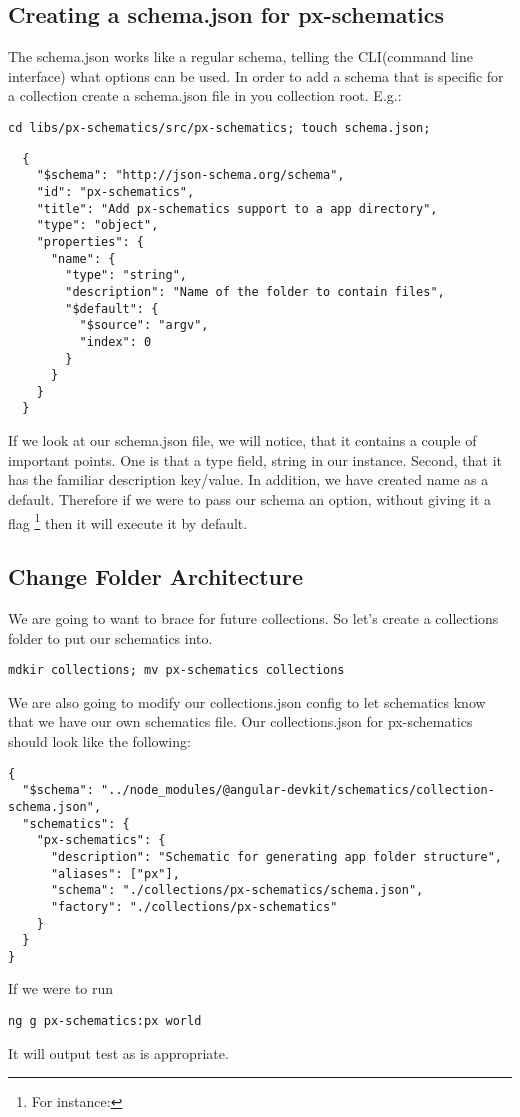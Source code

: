 \subsection{ Creating a schema.json for px-schematics }
The schema.json works like a regular schema, telling the CLI(command line
interface) what options can be used. In order to add a schema that is specific
for a collection create a schema.json file in you collection root. E.g.:
\begin{verbatim}
cd libs/px-schematics/src/px-schematics; touch schema.json;
\end{verbatim}

\begin{lstlisting}
  {
    "$schema": "http://json-schema.org/schema",
    "id": "px-schematics",
    "title": "Add px-schematics support to a app directory",
    "type": "object",
    "properties": {
      "name": {
        "type": "string",
        "description": "Name of the folder to contain files",
        "$default": {
          "$source": "argv",
          "index": 0
        }
      }
    }
  }
\end{lstlisting}
If we look at our schema.json file, we will notice, that it contains a couple
of important points. One is that a type field, string in our instance. Second,
that it has the familiar description key/value. In addition, we have created
name as a default. Therefore if we were to pass our schema an option, without
giving it a flag \footnote{For instance: }
then it will execute it by default.

\subsection{ Change Folder Architecture }
We are going to want to brace for future collections. So let's create a
collections folder to put our schematics into.
\begin{verbatim}
mdkir collections; mv px-schematics collections
\end{verbatim}

We are also going to modify our collections.json config to let schematics know
that we have our own schematics file. Our collections.json for px-schematics
should look like the following:

\begin{lstlisting}
{
  "$schema": "../node_modules/@angular-devkit/schematics/collection-schema.json",
  "schematics": {
    "px-schematics": {
      "description": "Schematic for generating app folder structure",
      "aliases": ["px"],
      "schema": "./collections/px-schematics/schema.json",
      "factory": "./collections/px-schematics"
    }
  }
}
\end{lstlisting}

If we were to run
\begin{verbatim}
ng g px-schematics:px world
\end{verbatim}

It will output test as is appropriate.
